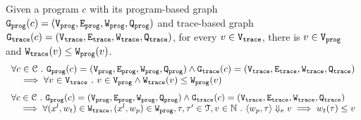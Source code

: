 \begin{lem}
	\label{lem:vertexweights_map}
	Given a program $c$ with its
	program-based graph $\progG({c}) = (\progV, \progE, \progW, \progF)$
	and 
	trace-based graph $\traceG({c}) = (\traceV, \traceE, \traceW, \traceF)$,
	for every $v \in \traceV$, there is $v \in \progV$ and $\traceW(v) \leq \progW(v)$.
%
%
\[
	\begin{array}{l}
	\forall c \in \cdom 
	 \st 
	 \progG({c}) = (\progV, \progE, \progW, \progF)
	\land 
	\traceG({c}) = (\traceV, \traceE, \traceW, \traceF)
	\\ \quad
	\implies
	\forall v \in \traceV \st 
	v \in \progV \land
	\traceW(v) \leq \progW(v)
	\end{array}
	\]
	\[
		\begin{array}{l}
			\forall c \in \cdom 
			 \st 
			 \progG({c}) = (\progV, \progE, \progW, \progF)
			\land 
			\traceG({c}) = (\traceV, \traceE, \traceW, \traceF)
			\\ \quad
			\implies
			\forall (x^l, w_{t}) \in \traceW,
			(x^l, w_{p}) \in \progW, \vtrace, \trace' \in \mathcal{T}, v \in \mathbb{N} \st
			\config{w_{p}, \trace} \earrow v
			\implies
			w_{t}(\trace) \leq v
		\end{array}
		\]
	\end{lem}
